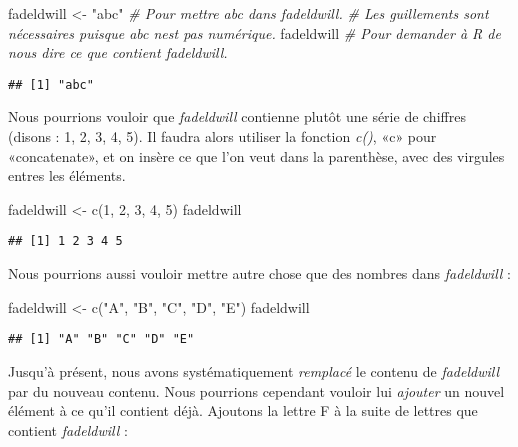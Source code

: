 \documentclass[
]{book}
\newenvironment{Shaded}{\begin{snugshade}}{\end{snugshade}}
\newcommand{\CommentTok}[1]{\textcolor[rgb]{0.56,0.35,0.01}{\textit{#1}}}
\newcommand{\DecValTok}[1]{\textcolor[rgb]{0.00,0.00,0.81}{#1}}
\newcommand{\FunctionTok}[1]{\textcolor[rgb]{0.00,0.00,0.00}{#1}}
\newcommand{\NormalTok}[1]{#1}
\newcommand{\OtherTok}[1]{\textcolor[rgb]{0.56,0.35,0.01}{#1}}
\newcommand{\StringTok}[1]{\textcolor[rgb]{0.31,0.60,0.02}{#1}}
\begin{document}
\begin{Shaded}
\begin{Highlighting}[]
\NormalTok{fadeldwill }\OtherTok{\textless{}{-}} \StringTok{"abc"} \CommentTok{\# Pour mettre abc dans fadeldwill. }
\CommentTok{\# Les guillements sont nécessaires puisque abc n\textquotesingle{}est pas numérique.}
\NormalTok{fadeldwill }\CommentTok{\# Pour demander à R de nous dire ce que contient fadeldwill.}
\end{Highlighting}
\end{Shaded}

\begin{verbatim}
## [1] "abc"
\end{verbatim}

Nous pourrions vouloir que \emph{fadeldwill} contienne plutôt une série de chiffres (disons : 1, 2, 3, 4, 5). Il faudra alors utiliser la fonction \emph{c()}, «c» pour «concatenate», et on insère ce que l'on veut dans la parenthèse, avec des virgules entres les éléments.

\begin{Shaded}
\begin{Highlighting}[]
\NormalTok{fadeldwill }\OtherTok{\textless{}{-}} \FunctionTok{c}\NormalTok{(}\DecValTok{1}\NormalTok{, }\DecValTok{2}\NormalTok{, }\DecValTok{3}\NormalTok{, }\DecValTok{4}\NormalTok{, }\DecValTok{5}\NormalTok{) }
\NormalTok{fadeldwill}
\end{Highlighting}
\end{Shaded}

\begin{verbatim}
## [1] 1 2 3 4 5
\end{verbatim}

Nous pourrions aussi vouloir mettre autre chose que des nombres dans \emph{fadeldwill} :

\begin{Shaded}
\begin{Highlighting}[]
\NormalTok{fadeldwill }\OtherTok{\textless{}{-}} \FunctionTok{c}\NormalTok{(}\StringTok{"A"}\NormalTok{, }\StringTok{"B"}\NormalTok{, }\StringTok{"C"}\NormalTok{, }\StringTok{"D"}\NormalTok{, }\StringTok{"E"}\NormalTok{) }
\NormalTok{fadeldwill}
\end{Highlighting}
\end{Shaded}

\begin{verbatim}
## [1] "A" "B" "C" "D" "E"
\end{verbatim}

Jusqu'à présent, nous avons systématiquement \emph{remplacé} le contenu de \emph{fadeldwill} par du nouveau contenu. Nous pourrions cependant vouloir lui \emph{ajouter} un nouvel élément à ce qu'il contient déjà. Ajoutons la lettre F à la suite de lettres que contient \emph{fadeldwill} :
\end{document}
